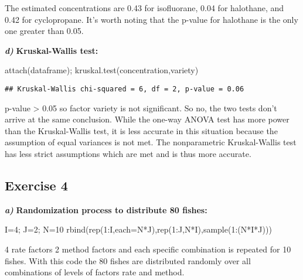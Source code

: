 \documentclass[
]{article}
\newenvironment{Shaded}{\begin{snugshade}}{\end{snugshade}}
\newcommand{\AttributeTok}[1]{\textcolor[rgb]{0.77,0.63,0.00}{#1}}
\newcommand{\DecValTok}[1]{\textcolor[rgb]{0.00,0.00,0.81}{#1}}
\newcommand{\FunctionTok}[1]{\textcolor[rgb]{0.00,0.00,0.00}{#1}}
\newcommand{\NormalTok}[1]{#1}
\newcommand{\OtherTok}[1]{\textcolor[rgb]{0.56,0.35,0.01}{#1}}
\newcommand{\SpecialCharTok}[1]{\textcolor[rgb]{0.00,0.00,0.00}{#1}}
\begin{document}
The estimated concentrations are 0.43 for isofluorane, 0.04 for
halothane, and 0.42 for cyclopropane. It's worth noting that the p-value
for halothane is the only one greater than 0.05.

\textbf{\emph{d)}} \textbf{Kruskal-Wallis test:}

\begin{Shaded}
\begin{Highlighting}[]
\FunctionTok{attach}\NormalTok{(dataframe); }\FunctionTok{kruskal.test}\NormalTok{(concentration,variety)}
\end{Highlighting}
\end{Shaded}

\begin{verbatim}
## Kruskal-Wallis chi-squared = 6, df = 2, p-value = 0.06
\end{verbatim}

p-value \textgreater{} 0.05 so factor variety is not significant. So no,
the two tests don't arrive at the same conclusion. While the one-way
ANOVA test has more power than the Kruskal-Wallis test, it is less
accurate in this situation because the assumption of equal variances is
not met. The nonparametric Kruskal-Wallis test has less strict
assumptions which are met and is thus more accurate.

\hypertarget{exercise-4}{%
\subsection{Exercise 4}\label{exercise-4}}

\textbf{\emph{a)}} \textbf{Randomization process to distribute 80
fishes:}

\begin{Shaded}
\begin{Highlighting}[]
\NormalTok{I}\OtherTok{=}\DecValTok{4}\NormalTok{; J}\OtherTok{=}\DecValTok{2}\NormalTok{; N}\OtherTok{=}\DecValTok{10}
\FunctionTok{rbind}\NormalTok{(}\FunctionTok{rep}\NormalTok{(}\DecValTok{1}\SpecialCharTok{:}\NormalTok{I,}\AttributeTok{each=}\NormalTok{N}\SpecialCharTok{*}\NormalTok{J),}\FunctionTok{rep}\NormalTok{(}\DecValTok{1}\SpecialCharTok{:}\NormalTok{J,N}\SpecialCharTok{*}\NormalTok{I),}\FunctionTok{sample}\NormalTok{(}\DecValTok{1}\SpecialCharTok{:}\NormalTok{(N}\SpecialCharTok{*}\NormalTok{I}\SpecialCharTok{*}\NormalTok{J)))}
\end{Highlighting}
\end{Shaded}

4 rate factors 2 method factors and each specific combination is
repeated for 10 fishes. With this code the 80 fishes are distributed
randomly over all combinations of levels of factors rate and method.
\end{document}
